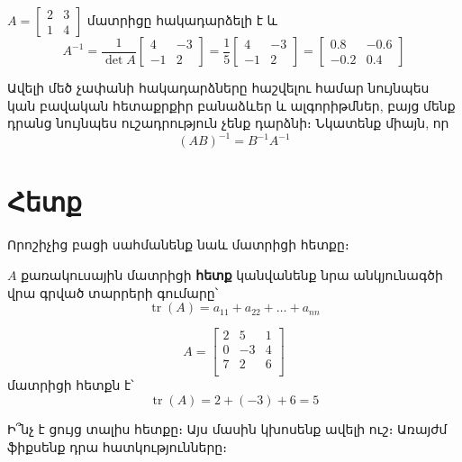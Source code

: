 \begin{example}
$A = \begin{bmatrix} 2 & 3 \\ 1 & 4 \end{bmatrix}$ մատրիցը հակադարձելի է և
\[
A^{-1} = \frac{1}{\det A} \begin{bmatrix} 4 & -3 \\ -1 & 2 \end{bmatrix} = \frac{1}{5} \begin{bmatrix} 4 & -3 \\ -1 & 2 \end{bmatrix}=\begin{bmatrix}
    0.8 & -0.6 \\ -0.2 & 0.4
\end{bmatrix}
\]
\end{example}


Ավելի մեծ չափանի հակադարձները հաշվելու համար նույնպես կան բավական հետաքրքիր բանաձևեր և ալգորիթմներ, բայց մենք դրանց նույնպես ուշադրություն չենք դարձնի։ Նկատենք միայն, որ
\[
\left(AB\right)^{-1} = B^{-1}A^{-1}
\]

\section{Հետք}

Որոշիչից բացի սահմանենք նաև մատրիցի հետքը։

\begin{definition}
$A$ քառակուսային մատրիցի \textbf{հետք} կանվանենք նրա անկյունագծի վրա գրված տարրերի գումարը՝
\[
\operatorname{tr}(A) = a_{11} + a_{22} + \ldots + a_{nn}
\]
\end{definition}

\begin{example}
\[
  A = \begin{bmatrix}
    2 & 5 & 1 \\
    0 & -3 & 4 \\
    7 & 2 & 6 \\
  \end{bmatrix}
\]
մատրիցի հետքն է՝
\[
  \operatorname{tr}(A) = 2 + (-3) + 6 = 5
\]
\end{example}

Ի՞նչ է ցույց տալիս հետքը։ Այս մասին կխոսենք ավելի ուշ։ Առայժմ ֆիքսենք դրա հատկությունները։

